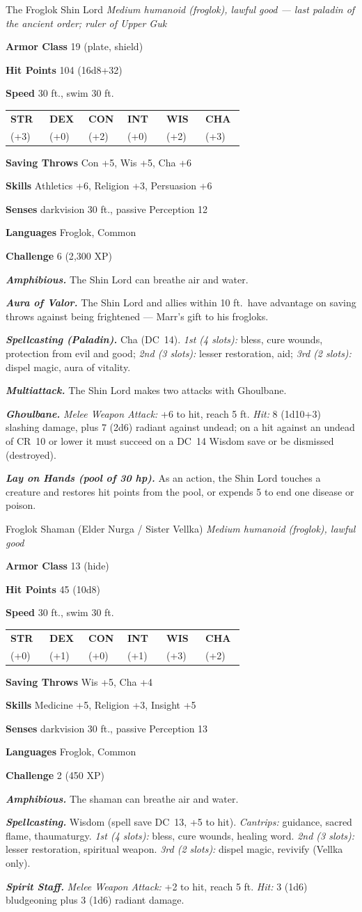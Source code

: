 \documentclass[10pt,twoside]{report}
\makeatletter
\newcommand{\msub}[1]{{\itshape #1}\par}
\newcommand{\mrule}{\par\vspace{2pt}{\color{gukred}\rule{\linewidth}{1.1pt}}\par\vspace{2pt}}
\newcommand{\mthin}{\par\vspace{1pt}{\color{gukred!60}\rule{\linewidth}{0.5pt}}\par\vspace{2pt}}
\newcommand{\mfield}[2]{\noindent\textbf{\color{gukred}#1} #2\par}
\newcommand{\mhead}[1]{\par\smallskip{\sffamily\bfseries\scshape\color{gukred}#1}\par
  \vspace{-3pt}{\color{gukred}\rule{\linewidth}{0.7pt}}\par\vspace{2pt}}
\newcommand{\mtrait}[2]{\noindent\textbf{\itshape #1} #2\par\vspace{2pt}}
\newcommand{\abilities}[6]{\par\smallskip\noindent
  {\setlength{\tabcolsep}{1.5pt}%
  \begin{tabular}{@{}*{6}{p{0.15\linewidth}}@{}}
  \centering\sffamily\bfseries\color{gukred}STR &\centering\sffamily\bfseries\color{gukred}DEX
  &\centering\sffamily\bfseries\color{gukred}CON &\centering\sffamily\bfseries\color{gukred}INT
  &\centering\sffamily\bfseries\color{gukred}WIS &\centering\arraybackslash\sffamily\bfseries\color{gukred}CHA\\
  \centering #1 &\centering #2 &\centering #3 &\centering #4 &\centering #5 &\centering\arraybackslash #6\\
  \end{tabular}}\par\smallskip}
\newcommand{\dc}[1]{DC~#1}
\makeatother
\begin{document}
\begin{statblock}{The Froglok Shin Lord}
\msub{Medium humanoid (froglok), lawful good --- \textnormal{last paladin of the ancient order; ruler of Upper Guk}}
\mrule
\mfield{Armor Class}{19 (plate, shield)}
\mfield{Hit Points}{104 (16d8+32)}
\mfield{Speed}{30 ft., swim 30 ft.}
\abilities{17 (+3)}{11 (+0)}{15 (+2)}{11 (+0)}{14 (+2)}{16 (+3)}
\mthin
\mfield{Saving Throws}{Con +5, Wis +5, Cha +6}
\mfield{Skills}{Athletics +6, Religion +3, Persuasion +6}
\mfield{Senses}{darkvision 30 ft., passive Perception 12}
\mfield{Languages}{Froglok, Common}
\mfield{Challenge}{6 (2{,}300 XP)}
\mrule
\mtrait{Amphibious.}{The Shin Lord can breathe air and water.}
\mtrait{Aura of Valor.}{The Shin Lord and allies within 10 ft.\ have advantage on saving throws against being frightened --- Marr's gift to his frogloks.}
\mtrait{Spellcasting (Paladin).}{Cha (\dc{14}). \textit{1st (4 slots):} bless, cure wounds, protection from evil and good; \textit{2nd (3 slots):} lesser restoration, aid; \textit{3rd (2 slots):} dispel magic, aura of vitality.}
\mhead{Actions}
\mtrait{Multiattack.}{The Shin Lord makes two attacks with Ghoulbane.}
\mtrait{Ghoulbane.}{\textit{Melee Weapon Attack:} +6 to hit, reach 5 ft. \textit{Hit:} 8 (1d10+3) slashing damage, plus 7 (2d6) radiant against undead; on a hit against an undead of CR~10 or lower it must succeed on a \dc{14} Wisdom save or be dismissed (destroyed).}
\mtrait{Lay on Hands (pool of 30 hp).}{As an action, the Shin Lord touches a creature and restores hit points from the pool, or expends 5 to end one disease or poison.}
\end{statblock}

\begin{statblock}{Froglok Shaman (Elder Nurga / Sister Vellka)}
\msub{Medium humanoid (froglok), lawful good}
\mrule
\mfield{Armor Class}{13 (hide)}
\mfield{Hit Points}{45 (10d8)}
\mfield{Speed}{30 ft., swim 30 ft.}
\abilities{10 (+0)}{12 (+1)}{11 (+0)}{13 (+1)}{17 (+3)}{14 (+2)}
\mthin
\mfield{Saving Throws}{Wis +5, Cha +4}
\mfield{Skills}{Medicine +5, Religion +3, Insight +5}
\mfield{Senses}{darkvision 30 ft., passive Perception 13}
\mfield{Languages}{Froglok, Common}
\mfield{Challenge}{2 (450 XP)}
\mrule
\mtrait{Amphibious.}{The shaman can breathe air and water.}
\mtrait{Spellcasting.}{Wisdom (spell save \dc{13}, +5 to hit). \textit{Cantrips:} guidance, sacred flame, thaumaturgy. \textit{1st (4 slots):} bless, cure wounds, healing word. \textit{2nd (3 slots):} lesser restoration, spiritual weapon. \textit{3rd (2 slots):} dispel magic, revivify (Vellka only).}
\mhead{Actions}
\mtrait{Spirit Staff.}{\textit{Melee Weapon Attack:} +2 to hit, reach 5 ft. \textit{Hit:} 3 (1d6) bludgeoning plus 3 (1d6) radiant damage.}
\end{statblock}
\end{document}
